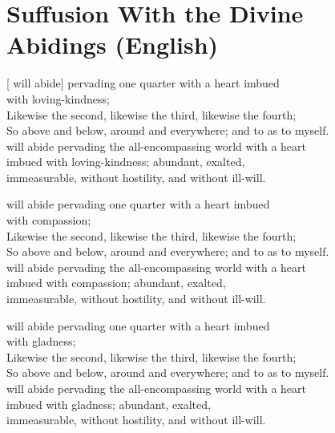
\section{Suffusion With the Divine Abidings (English)}


\begin{leader}
\end{leader}

[ will abide] pervading one quarter with a heart imbued\\
\vin with loving-kindness;\\
Likewise the second, likewise the third, likewise the fourth;\\
So above and below, around and everywhere; and to  as to myself.\\
 will abide pervading the all-encompassing world with a heart \\
\vin imbued with loving-kindness; abundant, exalted,\\
\vin immeasurable, without hostility, and without ill-will.

 will abide pervading one quarter with a heart imbued\\
\vin with compassion;\\
Likewise the second, likewise the third, likewise the fourth;\\
So above and below, around and everywhere; and to  as to myself.\\
 will abide pervading the all-encompassing world with a heart \\
\vin imbued with compassion; abundant, exalted,\\
\vin immeasurable, without hostility, and without ill-will.

 will abide pervading one quarter with a heart imbued\\
\vin with gladness;\\
Likewise the second, likewise the third, likewise the fourth;\\
So above and below, around and everywhere; and to  as to myself.\\
 will abide pervading the all-encompassing world with a heart \\
\vin imbued with gladness; abundant, exalted,\\
\vin immeasurable, without hostility, and without ill-will.

